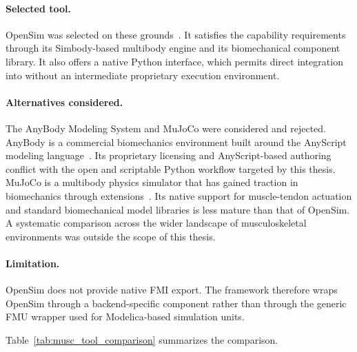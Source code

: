 \paragraph{Selected tool.}
OpenSim was selected on these grounds~\cite{OpenSim_Delp,seth_opensim_2018}.
It satisfies the capability requirements through its Simbody-based multibody engine and its biomechanical component library.
It also offers a native Python interface, which permits direct integration into \syssimx{} without an intermediate proprietary execution environment.

\paragraph{Alternatives considered.}
The AnyBody Modeling System and MuJoCo were considered and rejected.
AnyBody is a commercial biomechanics environment built around the AnyScript modeling language~\cite{damsgaard_analysis_2006}.
Its proprietary licensing and AnyScript-based authoring conflict with the open and scriptable Python workflow targeted by this thesis.
MuJoCo is a multibody physics simulator that has gained traction in biomechanics through extensions~\cite{todorov_mujoco_2012}.
Its native support for muscle-tendon actuation and standard biomechanical model libraries is less mature than that of OpenSim.
A systematic comparison across the wider landscape of musculoskeletal environments was outside the scope of this thesis.

\paragraph{Limitation.}
OpenSim does not provide native \ac{FMI} export.
The framework therefore wraps OpenSim through a backend-specific component rather than through the generic \ac{FMU} wrapper used for Modelica-based simulation units.

Table~\ref{tab:musc_tool_comparison} summarizes the comparison.

